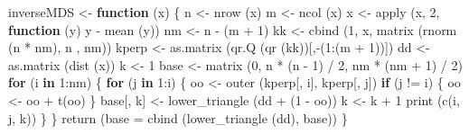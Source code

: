 \documentclass[
  12pt,
  letterpaper,
  DIV=11,
  numbers=noendperiod]{scrreprt}
\newenvironment{Shaded}{\begin{snugshade}}{\end{snugshade}}
\newcommand{\AttributeTok}[1]{\textcolor[rgb]{0.40,0.45,0.13}{#1}}
\newcommand{\ControlFlowTok}[1]{\textcolor[rgb]{0.00,0.23,0.31}{\textbf{#1}}}
\newcommand{\DecValTok}[1]{\textcolor[rgb]{0.68,0.00,0.00}{#1}}
\newcommand{\FunctionTok}[1]{\textcolor[rgb]{0.28,0.35,0.67}{#1}}
\newcommand{\NormalTok}[1]{\textcolor[rgb]{0.00,0.23,0.31}{#1}}
\newcommand{\OtherTok}[1]{\textcolor[rgb]{0.00,0.23,0.31}{#1}}
\newcommand{\SpecialCharTok}[1]{\textcolor[rgb]{0.37,0.37,0.37}{#1}}
\theoremstyle{remark}
\begin{document}
\begin{Shaded}
\begin{Highlighting}[]
\NormalTok{inverseMDS }\OtherTok{\textless{}{-}} \ControlFlowTok{function}\NormalTok{ (x) \{}
\NormalTok{  n }\OtherTok{\textless{}{-}} \FunctionTok{nrow}\NormalTok{ (x)}
\NormalTok{  m }\OtherTok{\textless{}{-}} \FunctionTok{ncol}\NormalTok{ (x)}
\NormalTok{  x }\OtherTok{\textless{}{-}} \FunctionTok{apply}\NormalTok{ (x, }\DecValTok{2}\NormalTok{, }\ControlFlowTok{function}\NormalTok{ (y)}
\NormalTok{    y }\SpecialCharTok{{-}} \FunctionTok{mean}\NormalTok{ (y))}
\NormalTok{  nm }\OtherTok{\textless{}{-}}\NormalTok{ n }\SpecialCharTok{{-}}\NormalTok{ (m }\SpecialCharTok{+} \DecValTok{1}\NormalTok{)}
\NormalTok{  kk }\OtherTok{\textless{}{-}} \FunctionTok{cbind}\NormalTok{ (}\DecValTok{1}\NormalTok{, x, }\FunctionTok{matrix}\NormalTok{ (}\FunctionTok{rnorm}\NormalTok{ (n }\SpecialCharTok{*}\NormalTok{ nm), n , nm))}
\NormalTok{  kperp }\OtherTok{\textless{}{-}} \FunctionTok{as.matrix}\NormalTok{ (}\FunctionTok{qr.Q}\NormalTok{ (}\FunctionTok{qr}\NormalTok{ (kk))[,}\SpecialCharTok{{-}}\NormalTok{(}\DecValTok{1}\SpecialCharTok{:}\NormalTok{(m }\SpecialCharTok{+} \DecValTok{1}\NormalTok{))])}
\NormalTok{  dd }\OtherTok{\textless{}{-}} \FunctionTok{as.matrix}\NormalTok{ (}\FunctionTok{dist}\NormalTok{ (x))}
\NormalTok{  k }\OtherTok{\textless{}{-}} \DecValTok{1}
\NormalTok{  base }\OtherTok{\textless{}{-}} \FunctionTok{matrix}\NormalTok{ (}\DecValTok{0}\NormalTok{, n }\SpecialCharTok{*}\NormalTok{ (n }\SpecialCharTok{{-}} \DecValTok{1}\NormalTok{) }\SpecialCharTok{/} \DecValTok{2}\NormalTok{, nm }\SpecialCharTok{*}\NormalTok{ (nm }\SpecialCharTok{+} \DecValTok{1}\NormalTok{) }\SpecialCharTok{/} \DecValTok{2}\NormalTok{)}
  \ControlFlowTok{for}\NormalTok{ (i }\ControlFlowTok{in} \DecValTok{1}\SpecialCharTok{:}\NormalTok{nm) \{}
    \ControlFlowTok{for}\NormalTok{ (j }\ControlFlowTok{in} \DecValTok{1}\SpecialCharTok{:}\NormalTok{i) \{}
\NormalTok{      oo }\OtherTok{\textless{}{-}} \FunctionTok{outer}\NormalTok{ (kperp[, i], kperp[, j])}
      \ControlFlowTok{if}\NormalTok{ (j }\SpecialCharTok{!=}\NormalTok{ i) \{}
\NormalTok{        oo }\OtherTok{\textless{}{-}}\NormalTok{ oo }\SpecialCharTok{+} \FunctionTok{t}\NormalTok{(oo)}
\NormalTok{      \}}
\NormalTok{      base[, k] }\OtherTok{\textless{}{-}} \FunctionTok{lower\_triangle}\NormalTok{ (dd }\SpecialCharTok{+}\NormalTok{ (}\DecValTok{1} \SpecialCharTok{{-}}\NormalTok{ oo))}
\NormalTok{      k }\OtherTok{\textless{}{-}}\NormalTok{ k }\SpecialCharTok{+} \DecValTok{1}
      \FunctionTok{print}\NormalTok{ (}\FunctionTok{c}\NormalTok{(i, j, k))}
\NormalTok{    \}}
\NormalTok{  \}}
  \FunctionTok{return}\NormalTok{ (}\AttributeTok{base =} \FunctionTok{cbind}\NormalTok{ (}\FunctionTok{lower\_triangle}\NormalTok{ (dd), base))}
\NormalTok{\}}


\end{Highlighting}
\end{Shaded}
\end{document}
